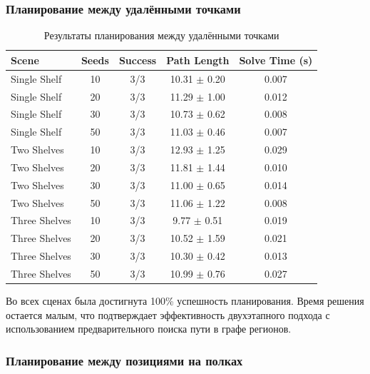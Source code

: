 \documentclass[a4paper,12pt]{extarticle}
\begin{document}
\subsubsection{Планирование между удалёнными точками}

\begin{table}[H]
\centering
\caption{Результаты планирования между удалёнными точками}
\begin{tabular}{lcccc}
\toprule
Scene & Seeds & Success & Path Length & Solve Time (s) \\
\midrule
Single Shelf & 10 & 3/3 & 10.31 $\pm$ 0.20 & 0.007 \\
Single Shelf & 20 & 3/3 & 11.29 $\pm$ 1.00 & 0.012 \\
Single Shelf & 30 & 3/3 & 10.73 $\pm$ 0.62 & 0.008 \\
Single Shelf & 50 & 3/3 & 11.03 $\pm$ 0.46 & 0.007 \\
\midrule
Two Shelves & 10 & 3/3 & 12.93 $\pm$ 1.25 & 0.029 \\
Two Shelves & 20 & 3/3 & 11.81 $\pm$ 1.44 & 0.010 \\
Two Shelves & 30 & 3/3 & 11.00 $\pm$ 0.65 & 0.014 \\
Two Shelves & 50 & 3/3 & 11.06 $\pm$ 1.22 & 0.008 \\
\midrule
Three Shelves & 10 & 3/3 & 9.77 $\pm$ 0.51 & 0.019 \\
Three Shelves & 20 & 3/3 & 10.52 $\pm$ 1.59 & 0.021 \\
Three Shelves & 30 & 3/3 & 10.30 $\pm$ 0.42 & 0.013 \\
Three Shelves & 50 & 3/3 & 10.99 $\pm$ 0.76 & 0.027 \\
\bottomrule
\end{tabular}
\end{table}

Во всех сценах была достигнута 100\% успешность планирования. Время решения
остается малым, что подтверждает эффективность двухэтапного подхода с
использованием предварительного поиска пути в графе регионов.

\subsubsection{Планирование между позициями на полках}
\end{document}

